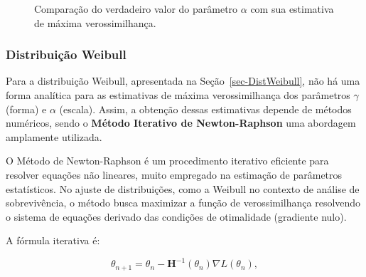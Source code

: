 \documentclass[
  12pt,
  letterpaper,
  DIV=11,
  numbers=noendperiod]{scrreprt}
\begin{document}
\begin{figure}[H]

\caption{\label{fig-CompEMVexp}Comparação do verdadeiro valor do
parâmetro \(\alpha\) com sua estimativa de máxima verossimilhança.}


\end{figure}%

\subsubsection{Distribuição Weibull}\label{distribuiuxe7uxe3o-weibull}

Para a distribuição Weibull, apresentada na Seção~\ref{sec-DistWeibull},
não há uma forma analítica para as estimativas de máxima verossimilhança
dos parâmetros \(\gamma\) (forma) e \(\alpha\) (escala). Assim, a
obtenção dessas estimativas depende de métodos numéricos, sendo o
\textbf{Método Iterativo de Newton-Raphson} uma abordagem amplamente
utilizada.

O Método de Newton-Raphson é um procedimento iterativo eficiente para
resolver equações não lineares, muito empregado na estimação de
parâmetros estatísticos. No ajuste de distribuições, como a Weibull no
contexto de análise de sobrevivência, o método busca maximizar a função
de verossimilhança resolvendo o sistema de equações derivado das
condições de otimalidade (gradiente nulo).

A fórmula iterativa é:

\[
\theta_{n+1} = \theta_{n} - \mathbf{H}^{-1}(\theta_{n}) \nabla L(\theta_{n}),
\]
\end{document}

